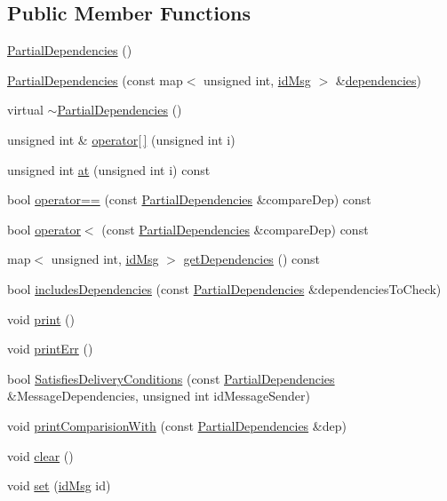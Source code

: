 \subsection*{Public Member Functions}
\begin{DoxyCompactItemize}
\item 
\hyperlink{class_partial_dependencies_aefb05dec194a9ab63482df6645cbd842}{Partial\+Dependencies} ()
\item 
\hyperlink{class_partial_dependencies_a1f17aad6d01c7e8cdc40bf99138eb528}{Partial\+Dependencies} (const map$<$ unsigned int, \hyperlink{structures_8h_a83a1d9a070efa5341da84cfd8e28d3e5}{id\+Msg} $>$ \&\hyperlink{class_partial_dependencies_a4b72531ce3a3b7c4b6f02d0fe8ea1a7c}{dependencies})
\item 
virtual \hyperlink{class_partial_dependencies_a8fa3da23d89db5b71b42e234617755f7}{$\sim$\+Partial\+Dependencies} ()
\item 
unsigned int \& \hyperlink{class_partial_dependencies_afafbc86f0bc7c649bcfbddbb90125e8f}{operator\mbox{[}$\,$\mbox{]}} (unsigned int i)
\item 
unsigned int \hyperlink{class_partial_dependencies_ac0a0d04664f3a953596ca26224f5ed7d}{at} (unsigned int i) const
\item 
bool \hyperlink{class_partial_dependencies_a432719e4e5fdcd9cdb0d3a5ce2a5c8af}{operator==} (const \hyperlink{class_partial_dependencies}{Partial\+Dependencies} \&compare\+Dep) const
\item 
bool \hyperlink{class_partial_dependencies_af8f87bc4a622db0f56276502c6655f38}{operator$<$} (const \hyperlink{class_partial_dependencies}{Partial\+Dependencies} \&compare\+Dep) const
\item 
map$<$ unsigned int, \hyperlink{structures_8h_a83a1d9a070efa5341da84cfd8e28d3e5}{id\+Msg} $>$ \hyperlink{class_partial_dependencies_a816f0a770b1d6f3255a1485705e262d2}{get\+Dependencies} () const
\item 
bool \hyperlink{class_partial_dependencies_a4cfd27959669b5b7b58ea07d38824d7b}{includes\+Dependencies} (const \hyperlink{class_partial_dependencies}{Partial\+Dependencies} \&dependencies\+To\+Check)
\item 
void \hyperlink{class_partial_dependencies_a9a9346473ba5de6a1bdffb44145f8fca}{print} ()
\item 
void \hyperlink{class_partial_dependencies_ac4c98e7d381b9e9efa54a094d1da729d}{print\+Err} ()
\item 
bool \hyperlink{class_partial_dependencies_a67a733dba9069541f83fecee520ccce1}{Satisfies\+Delivery\+Conditions} (const \hyperlink{class_partial_dependencies}{Partial\+Dependencies} \&Message\+Dependencies, unsigned int id\+Message\+Sender)
\item 
void \hyperlink{class_partial_dependencies_ad6e8fb1bff79b43dab24727b3511caf0}{print\+Comparision\+With} (const \hyperlink{class_partial_dependencies}{Partial\+Dependencies} \&dep)
\item 
void \hyperlink{class_partial_dependencies_a6543f75ad3391ee5d0cb0614ca97b9c0}{clear} ()
\item 
void \hyperlink{class_partial_dependencies_ad60f5e87d6d7e027c399bd1a8206a952}{set} (\hyperlink{structures_8h_a83a1d9a070efa5341da84cfd8e28d3e5}{id\+Msg} id)
\end{DoxyCompactItemize}

